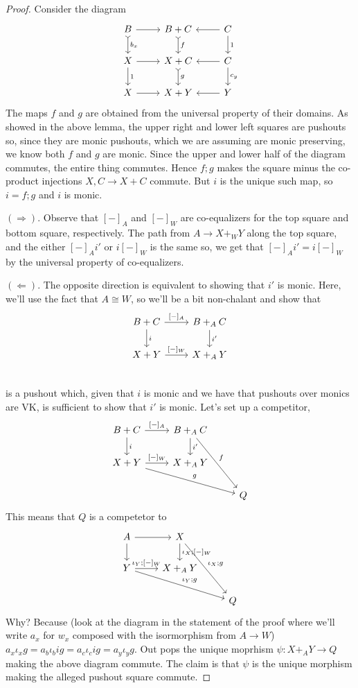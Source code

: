 \documentclass[12pt]{article}
\newcommand{\from}{\colon}
\renewcommand{\(}{\left(}
\renewcommand{\)}{\right)}
\renewcommand{\{}{\left\lbrace}
\renewcommand{\}}{\right\rbrace}
\theoremstyle{remark}
\theoremstyle{definition}
\begin{document}
 \begin{proof}
 	Consider the diagram
 	\[
 	\begin{tikzcd}
	 	{B} \ar[d, rightarrowtail,"b_x"] \ar[r] &
	 	{B+C} \ar[d,rightarrowtail,"f"] &
	 	{C} \ar[l] \ar[d,"1"]\\
	 	{X} \ar[r] \ar[d,"1"] &
	 	{X+C} \ar[d,rightarrowtail,"g"]&
	 	{C} \ar[l] \ar[d,"c_y"] \\
	 	{X} \ar[r]  &
	 	{X+Y} &
	 	{Y} \ar[l]
 	\end{tikzcd}
\] 	
 	The maps $f$ and $g$ are obtained from the universal property of their domains.  As showed in the above lemma, the upper right and lower left squares are pushouts so, since they are monic pushouts, which we are assuming are monic preserving, we know both $f$ and $g$ are monic. Since the upper and lower half of the diagram commutes, the entire thing commutes.  Hence $f;g$ makes the square minus the co-product injections $X,C \to X+C$ commute. But $i$ is the unique such map, so $i=f;g$ and $i$ is monic.  
 	
 	$(\Rightarrow)$.  Observe that $[-]_A$ and $[-]_W$ are co-equalizers for the top square and bottom square, respectively.  The path from $A \to X+_WY$ along the top square, and the either $[-]_A i'$ or $i[-]_W$ is the same so, we get that $[-]_A i'=i[-]_W$ by the universal property  of co-equalizers.  
 	
 	$(\Leftarrow)$. The opposite direction is equivalent to showing that $i'$ is monic. Here, we'll use the fact that $A \cong W$, so we'll be a bit non-chalant and show that 
 	\[
 	\begin{tikzcd}
	 	{B+C} \ar[r,"{[-]_A}"] \ar[d,"i"] &
	 	{B+_AC} \ar[d,"i'"]\\
	 	{X+Y} \ar[r,"{[-]_W}"] &
	 	{X+_AY} \\
 	\end{tikzcd}
 	\]
 	is a pushout which, given that $i$ is monic and we have that pushouts over monics are VK, is sufficient to show that $i'$ is monic. Let's set up a competitor,
 	\[
 	\begin{tikzcd}
	 	{B+C} \ar[r,"{[-]_A}"] \ar[d,"i"] &
	 	{B+_AC} \ar[d,"i'"] \ar[ddr,"f"]&
	 	{} \\
	 	{X+Y} \ar[r,"{[-]_W}"] \ar[drr,"g"]&
	 	{X+_AY} &
	 	{} \\
	 	{} &
	 	{} &
	 	{Q}
 	\end{tikzcd}
 	\]
 	This means that $Q$ is a competetor to
 	\[
 	\begin{tikzcd}
	 	{A} \ar[r] \ar[d] &
	 	{X} \ar[d,"{\iota_X;[-]_W}"] \ar[ddr,"\iota_X;g"]&
	 	{} \\
	 	{Y} \ar[r,"{\iota_Y;[-]_W}"] \ar[drr,"\iota_Y;g"]&
	 	{X+_AY} &
	 	{} \\
	 	{} &
	 	{} &
	 	{Q}
 	\end{tikzcd}
 	\]
 	Why? Because (look at the diagram in the statement of the proof where we'll write $a_x$ for $w_x$ composed with the isormorphism from $A \to W$) $a_x\iota_xg= a_b\iota_big = a_c\iota_cig=a_y\iota_yg$. Out pops the unique moprhism $\psi \from X+_AY \to Q$ making the above diagram commute.  The claim is that $\psi$ is the unique morphism making the alleged pushout square commute.  
 	

\end{proof}
\end{document}
